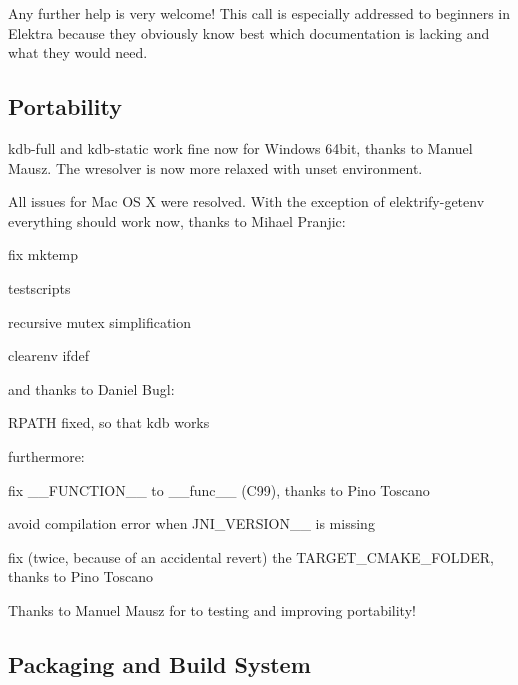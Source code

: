 Any further help is very welcome! This call is especially addressed to beginners in Elektra because they obviously know best which documentation is lacking and what they would need.

\subsection*{Portability}

{\ttfamily kdb-\/full} and {\ttfamily kdb-\/static} work fine now for Windows 64bit, thanks to Manuel Mausz. The wresolver is now more relaxed with unset environment.

All issues for Mac O\+S X were resolved. With the exception of elektrify-\/getenv everything should work now, thanks to Mihael Pranjic\+:


\begin{DoxyItemize}
\item fix mktemp
\item testscripts
\item recursive mutex simplification
\item clearenv ifdef
\end{DoxyItemize}

and thanks to Daniel Bugl\+:


\begin{DoxyItemize}
\item R\+P\+A\+T\+H fixed, so that {\ttfamily kdb} works
\end{DoxyItemize}

furthermore\+:


\begin{DoxyItemize}
\item fix {\ttfamily \+\_\+\+\_\+\+F\+U\+N\+C\+T\+I\+O\+N\+\_\+\+\_\+} to {\ttfamily \+\_\+\+\_\+func\+\_\+\+\_\+} (C99), thanks to Pino Toscano
\item avoid compilation error when J\+N\+I\+\_\+\+V\+E\+R\+S\+I\+O\+N\+\_\+\_ is missing
\item fix (twice, because of an accidental revert) the T\+A\+R\+G\+E\+T\+\_\+\+C\+M\+A\+K\+E\+\_\+\+F\+O\+L\+D\+E\+R, thanks to Pino Toscano
\end{DoxyItemize}

Thanks to Manuel Mausz for to testing and improving portability!

\subsection*{Packaging and Build System}


